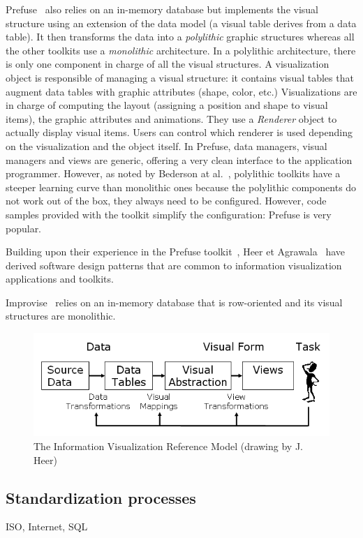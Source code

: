 Prefuse~\cite{Prefuse} also relies on an in-memory database but
implements the visual structure using an extension of the data model (a
visual table derives from a data table).  It then transforms the data
into a \emph{polylithic} graphic structures whereas all the other
toolkits use a \emph{monolithic} architecture.  In a polylithic
architecture, there is only one component in charge of all the visual
structures.  A visualization object is responsible of managing a
visual structure: it contains visual tables that augment data tables
with graphic attributes (shape, color, etc.) Visualizations are in
charge of computing the layout (assigning a position and shape to
visual items), the graphic attributes and animations.  They use a
\emph{Renderer}  object to actually display visual items.  Users can
control which renderer is used depending on the visualization and the
object itself.  In Prefuse, data managers, visual managers and views
are generic, offering a very clean interface to the application
programmer.  However, as noted by Bederson at al.~\cite{Polylithic},
polylithic toolkits have a steeper learning curve than monolithic ones
because the polylithic components do not work out of the box, they
always need to be configured.  However, code samples provided with the
toolkit simplify the configuration: Prefuse is very popular.

Building upon their experience in the Prefuse toolkit~\cite{Prefuse},
Heer et Agrawala~\cite{DesignPatternsIV} have derived software design
patterns that are common to information visualization applications and
toolkits. 

Improvise~\cite{Improvise} relies on an in-memory database that is
row-oriented and its visual structures are monolithic.  


\begin{figure}
\includegraphics[width=\columnwidth]{figures/reference_model}
\caption{The Information Visualization Reference Model (drawing by
  J. Heer)}
\label{fig:refmodel}
\end{figure}


\subsection{Standardization processes}
ISO, Internet, SQL





